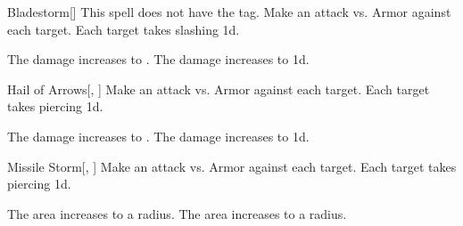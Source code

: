 \lowercase{\hypertarget{spell:Bladestorm}{}}\label{spell:Bladestorm}
\begin{freeability}[Rank 3]{\hypertarget{spell:Bladestorm}{Bladestorm}}[]
This spell does not have the  tag.
Make an attack vs. Armor against each target.
\hit Each target takes slashing  \minus1d.

\rankline
{} The damage increases to .
 The damage increases to  \plus1d.

\end{freeability}
\vspace{0.25em}



\lowercase{\hypertarget{spell:Hail of Arrows}{}}\label{spell:Hail of Arrows}
\begin{freeability}[Rank 3]{\hypertarget{spell:Hail of Arrows}{Hail of Arrows}}[, ]
Make an attack vs. Armor against each target.
\hit Each target takes piercing  \minus1d.

\rankline
{} The damage increases to .
 The damage increases to  \plus1d.

\end{freeability}
\vspace{0.25em}



\lowercase{\hypertarget{spell:Missile Storm}{}}\label{spell:Missile Storm}
\begin{freeability}[Rank 3]{\hypertarget{spell:Missile Storm}{Missile Storm}}[, ]
Make an attack vs. Armor against each target.
\hit Each target takes piercing  \minus1d.

\rankline
{} The area increases to a \arealarge radius.
 The area increases to a \areahuge radius.

\end{freeability}
\vspace{0.25em}



